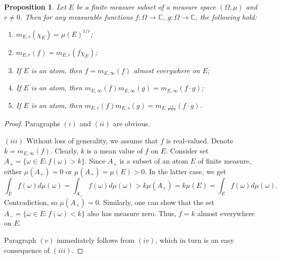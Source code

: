 \documentclass[12pt]{article}
\newtheorem{proposition}[theorem]{Proposition}
\begin{document}
\begin{proposition}\label{GnrlzdMeanProp}
    Let $E$ be a finite measure subset of a measure space $(\Omega,\mu)$ 
    and $r\neq 0$. Then for any measurable 
    functions $f:\Omega\to\mathbb{C}$, $g:\Omega\to\mathbb{C}$, the following 
    hold:
    \begin{enumerate}[label = (\roman*)]
        \item $m_{E,r}(\chi_E)=\mu(E)^{1/r}$;
        \item $m_{E,r}(f)=m_{E,r}(f\chi_E)$;
        \item If $E$ is an atom, then $f=m_{E,\infty}(f)$ almost 
        everywhere on $E$;
        \item If $E$ is an atom, 
        then $m_{E,\infty}(f)m_{E,\infty}(g)=m_{E,\infty}(f\cdot g)$;
        \item If $E$ is an atom, 
        then $m_{E,r}(f)m_{E,s}(g)=m_{E,\frac{rs}{r+s}}(f\cdot g)$.
    \end{enumerate}
\end{proposition}
\begin{proof}
    Paragraphs $(i)$ and $(ii)$ are obvious.

    $(iii)$ Without loss of generality, we assume that $f$ is real-valued. 
    Denote $k=m_{E,\infty}(f)$. Clearly, $k$ is a mean value of $f$ on $E$. 
    Consider set $A_+=\{\omega\in E: f(\omega)>k\}$. Since $A_+$ is a subset of 
    an atom $E$ of finite measure, either $\mu(A_+)=0$ or $\mu(A_+)=\mu(E)>0$. 
    In the latter case, we get 
    \[
        \int_E f(\omega)d\mu(\omega)
        =\int_{A_+}f(\omega)d\mu(\omega)
        >k\mu(A_+)
        =k\mu(E)
        =\int_E f(\omega)d\mu(\omega).
    \]
    Contradiction, so $\mu(A_+)=0$. Similarly, one can show that the 
    set $A_-=\{\omega\in E:f(\omega)<k\}$ also has measure zero. Thus, $f=k$ 
    almost everywhere on $E$.

    Paragraph $(v)$ immediately follows from $(iv)$, which in turn is an easy 
    consequence of $(iii)$.
\end{proof}
\end{document}

